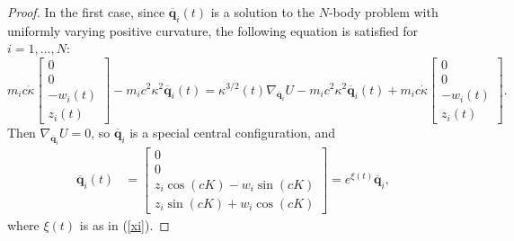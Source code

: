 \documentclass[12pt]{amsart}
\theoremstyle{definition}
\newcommand {\q} {\mathbf{q}}
\begin{document}
{\begin{proof}
In the first case, since $\overline{\q}_i(t)$ is a solution to the $N$-body problem with uniformly varying positive curvature, the following equation is satisfied for $i=1,\ldots, N$:
\begin{equation*}
m_ic\dot{\kappa}\begin{bmatrix}0\\ 0 \\ -w_i(t)\\ z_i(t)\end{bmatrix}-m_ic^2\kappa^2\overline{\q}_i(t)=\kappa^{3/2}(t)\nabla_{\overline{\q}_i} U - m_ic^2\kappa^2\overline{\q}_i(t) + m_ic\dot{\kappa}\begin{bmatrix}0 \\ 0 \\ -w_i(t) \\ z_i(t)\end{bmatrix}.\end{equation*}
Then $\nabla_{\overline{\q}_i} U=0$, so $\overline{\q}_i$ is a special central configuration, and 
\begin{align*}
\overline{\q}_i(t)&=\begin{bmatrix}0 \\ 0 \\  z_i\cos(cK)-w_i\sin(cK)\\ z_i\sin(cK)+w_i\cos(cK)\end{bmatrix}= e^{\xi(t)}\overline{\q}_i, 
\end{align*}
where $\xi(t)$ is as in (\ref{xi}).



\end{proof}}
\end{document}
